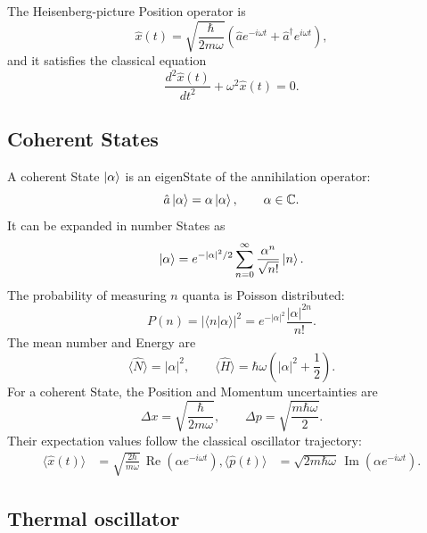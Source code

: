 \documentclass[a4paper, 10pt, onepage]{elegantbook}
\begin{document}
{The Heisenberg-picture Position operator is
\begin{equation}
  \hat{x}(t)
  =\sqrt{\frac{\hbar}{2m\omega}}
   \left(\hat{a}e^{-i\omega t}
   +\hat{a}^{\dagger}e^{i\omega t}\right),
\end{equation}
and it satisfies the classical equation
\begin{equation}
  \frac{d^2\hat{x}(t)}{dt^2}+\omega^2\hat{x}(t)=0.
\end{equation}

\subsection{Coherent States}

A coherent State $\ket{\alpha}$ is an eigenState of the annihilation
operator:
\begin{equation}
  \hat{a}\ket{\alpha}=\alpha\ket{\alpha},
  \qquad \alpha\in\mathbb{C}.
\end{equation}
It can be expanded in number States as
\begin{equation}
  \ket{\alpha}
  =e^{-|\alpha|^2/2}
   \sum_{n=0}^{\infty}\frac{\alpha^n}{\sqrt{n!}}\ket{n}.
\end{equation}
The probability of measuring $n$ quanta is Poisson distributed:
\begin{equation}
  P(n)=|\langle n\vert\alpha\rangle|^2
  =e^{-|\alpha|^2}\frac{|\alpha|^{2n}}{n!}.
\end{equation}
The mean number and Energy are
\begin{equation}
  \langle\hat{N}\rangle=|\alpha|^2,\qquad
  \langle\hat{H}\rangle
  =\hbar\omega\left(|\alpha|^2+\frac{1}{2}\right).
\end{equation}
For a coherent State, the Position and Momentum uncertainties are
\begin{equation}
  \Delta x=\sqrt{\frac{\hbar}{2m\omega}},
  \qquad
  \Delta p=\sqrt{\frac{m\hbar\omega}{2}}.
\end{equation}
Their expectation values follow the classical oscillator trajectory:
\begin{align}
  \langle\hat{x}(t)\rangle
  &=\sqrt{\frac{2\hbar}{m\omega}}\,
    \operatorname{Re}\!\left(\alpha e^{-i\omega t}\right),
  \langle\hat{p}(t)\rangle
  &=\sqrt{2m\hbar\omega}\,
    \operatorname{Im}\!\left(\alpha e^{-i\omega t}\right).
\end{align}

\subsection{Thermal oscillator}

}
\end{document}
